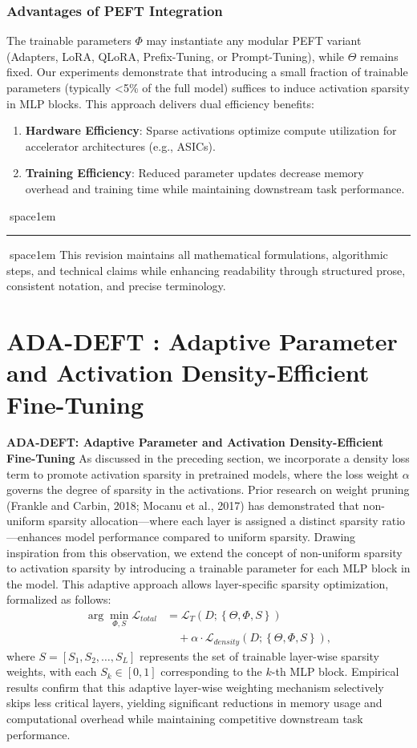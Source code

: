 \documentclass[conference]{IEEEtran}
\begin{document}
\subsubsection*{Advantages of PEFT Integration}
The trainable parameters \(\Phi\) may instantiate any modular PEFT variant (Adapters, LoRA, QLoRA, Prefix-Tuning, or Prompt-Tuning), while \(\Theta\) remains fixed. Our experiments demonstrate that introducing a small fraction of trainable parameters (typically \textless{}5\% of the full model) suffices to induce activation sparsity in MLP blocks. This approach delivers dual efficiency benefits:
\begin{enumerate}
  \item \textbf{Hardware Efficiency}: Sparse activations optimize compute utilization for accelerator architectures (e.g., ASICs).
  \item \textbf{Training Efficiency}: Reduced parameter updates decrease memory overhead and training time while maintaining downstream task performance.
\end{enumerate}
space{1em} \hrule space{1em}
This revision maintains all mathematical formulations, algorithmic steps, and technical claims while enhancing readability through structured prose, consistent notation, and precise terminology.




\section{ADA-DEFT : Adaptive Parameter and Activation Density-Efficient Fine-Tuning}

\textbf{ADA-DEFT: Adaptive Parameter and Activation Density-Efficient Fine-Tuning} As discussed in the preceding section, we incorporate a density loss term to promote activation sparsity in pretrained models, where the loss weight \(\alpha\) governs the degree of sparsity in the activations. Prior research on weight pruning (Frankle and Carbin, 2018; Mocanu et al., 2017) has demonstrated that non-uniform sparsity allocation—where each layer is assigned a distinct sparsity ratio—enhances model performance compared to uniform sparsity. Drawing inspiration from this observation, we extend the concept of non-uniform sparsity to activation sparsity by introducing a trainable parameter for each MLP block in the model. This adaptive approach allows layer-specific sparsity optimization, formalized as follows:
\[\begin{aligned}
\arg\min_{\Phi,S}\mathcal{L}_{total} &= \mathcal{L}_{T}\left(D;\left\{\Theta,\Phi,S\right\}\right) \\
&\quad + \alpha \cdot \mathcal{L}_{density}\left(D;\left\{\Theta,\Phi,S\right\}\right),
\end{aligned}\]
where \(S = [S_{1}, S_{2}, \ldots, S_{L}]\) represents the set of trainable layer-wise sparsity weights, with each \(S_{k} \in [0, 1]\) corresponding to the \(k\)-th MLP block. Empirical results confirm that this adaptive layer-wise weighting mechanism selectively skips less critical layers, yielding significant reductions in memory usage and computational overhead while maintaining competitive downstream task performance.
\end{document}
